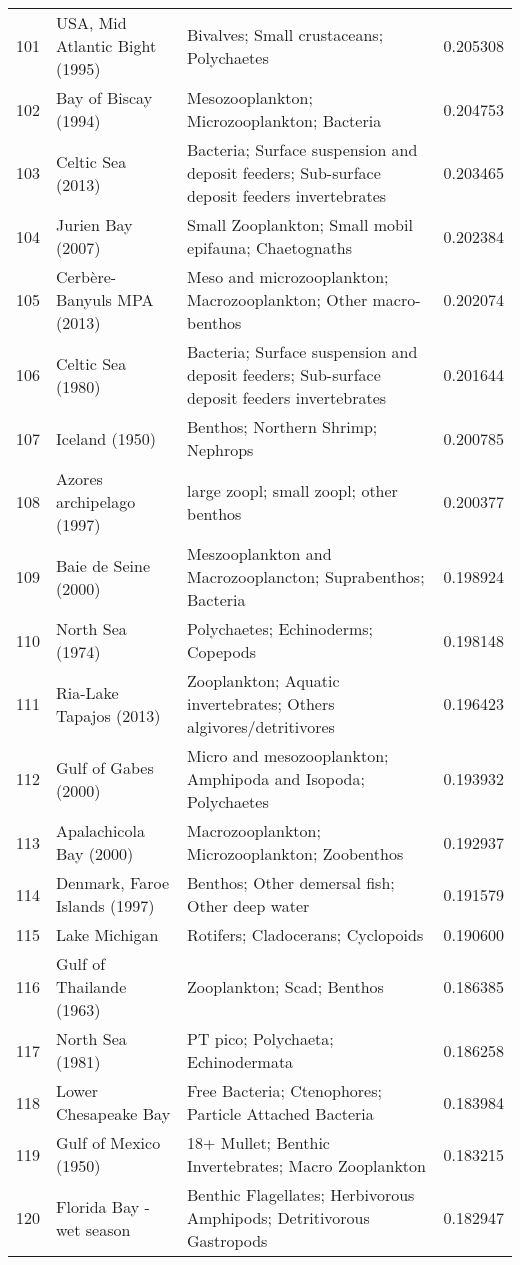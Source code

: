 \begin{tabular}{rllr}
101 & USA, Mid Atlantic Bight (1995) & Bivalves; Small crustaceans; Polychaetes & 0.205308 \\
102 & Bay of Biscay (1994) & Mesozooplankton; Microzooplankton; Bacteria & 0.204753 \\
103 & Celtic Sea (2013) & Bacteria; Surface suspension and deposit feeders; Sub-surface deposit feeders invertebrates & 0.203465 \\
104 & Jurien Bay (2007) & Small Zooplankton; Small mobil epifauna; Chaetognaths & 0.202384 \\
105 & Cerbère-Banyuls MPA (2013) & Meso and microzooplankton; Macrozooplankton; Other macro-benthos & 0.202074 \\
106 & Celtic Sea (1980) & Bacteria; Surface suspension and deposit feeders; Sub-surface deposit feeders invertebrates & 0.201644 \\
107 & Iceland (1950) & Benthos; Northern Shrimp; Nephrops & 0.200785 \\
108 & Azores archipelago (1997) & large zoopl; small zoopl; other benthos & 0.200377 \\
109 & Baie de Seine (2000) & Meszooplankton and Macrozooplancton; Suprabenthos; Bacteria & 0.198924 \\
110 & North Sea (1974) & Polychaetes; Echinoderms; Copepods & 0.198148 \\
111 & Ria-Lake Tapajos (2013) & Zooplankton; Aquatic invertebrates; Others algivores/detritivores & 0.196423 \\
112 & Gulf of Gabes (2000) & Micro and mesozooplankton; Amphipoda and Isopoda; Polychaetes & 0.193932 \\
113 & Apalachicola Bay (2000) & Macrozooplankton; Microzooplankton; Zoobenthos & 0.192937 \\
114 & Denmark, Faroe Islands (1997) & Benthos; Other demersal fish; Other deep water & 0.191579 \\
115 & Lake Michigan & Rotifers; Cladocerans; Cyclopoids & 0.190600 \\
116 & Gulf of Thailande (1963) & Zooplankton; Scad; Benthos & 0.186385 \\
117 & North Sea (1981) & PT pico; Polychaeta; Echinodermata & 0.186258 \\
118 & Lower Chesapeake Bay & Free Bacteria; Ctenophores; Particle Attached Bacteria & 0.183984 \\
119 & Gulf of Mexico (1950) & 18+ Mullet; Benthic Invertebrates; Macro Zooplankton & 0.183215 \\
120 & Florida Bay - wet season & Benthic Flagellates; Herbivorous Amphipods; Detritivorous Gastropods & 0.182947 \\

\end{tabular}
